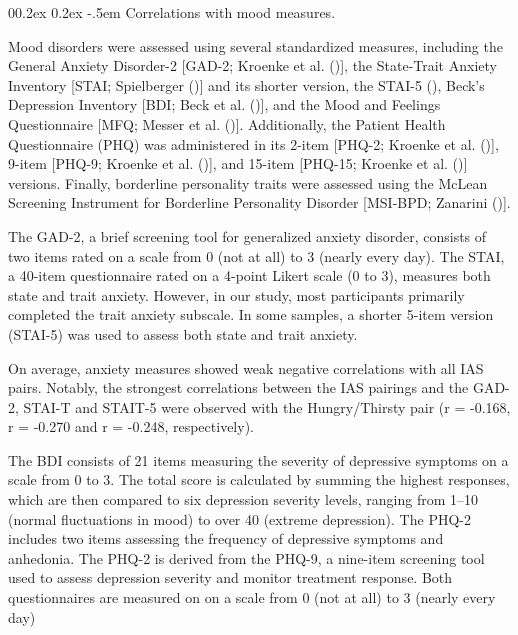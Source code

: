 \documentclass[
  man,
  floatsintext,
  longtable,
  nolmodern,
  notxfonts,
  notimes,
  colorlinks=true,linkcolor=blue,citecolor=blue,urlcolor=blue]{apa7}
\makeatletter
\renewcommand{\paragraph}{\@startsection{paragraph}{4}{\parindent}%
	{0\baselineskip \@plus 0.2ex \@minus 0.2ex}%
	{-.5em}%
	{\normalfont\normalsize\bfseries\typesectitle}}
\makeatother
\begin{document}
\paragraph{Correlations with mood
measures.}\label{correlations-with-mood-measures}

Mood disorders were assessed using several standardized measures,
including the General Anxiety Disorder-2 {[}GAD-2; Kroenke et al.
(){]}, the State-Trait Anxiety
Inventory {[}STAI; Spielberger
(){]} and its shorter version,
the STAI-5 (),
Beck's Depression Inventory {[}BDI; Beck et al.
(){]}, and the Mood and Feelings
Questionnaire {[}MFQ; Messer et al.
(){]}. Additionally, the
Patient Health Questionnaire (PHQ) was administered in its 2-item
{[}PHQ-2; Kroenke et al. (){]},
9-item {[}PHQ-9; Kroenke et al.
(){]}, and 15-item {[}PHQ-15; Kroenke
et al. (){]} versions. Finally,
borderline personality traits were assessed using the McLean Screening
Instrument for Borderline Personality Disorder {[}MSI-BPD; Zanarini
(){]}.

The GAD-2, a brief screening tool for generalized anxiety disorder,
consists of two items rated on a scale from 0 (not at all) to 3 (nearly
every day). The STAI, a 40-item questionnaire rated on a 4-point Likert
scale (0 to 3), measures both state and trait anxiety. However, in our
study, most participants primarily completed the trait anxiety subscale.
In some samples, a shorter 5-item version (STAI-5) was used to assess
both state and trait anxiety.

On average, anxiety measures showed weak negative correlations with all
IAS pairs. Notably, the strongest correlations between the IAS pairings
and the GAD-2, STAI-T and STAIT-5 were observed with the Hungry/Thirsty
pair (r = -0.168, r = -0.270 and r = -0.248, respectively).

The BDI consists of 21 items measuring the severity of depressive
symptoms on a scale from 0 to 3. The total score is calculated by
summing the highest responses, which are then compared to six depression
severity levels, ranging from 1--10 (normal fluctuations in mood) to
over 40 (extreme depression). The PHQ-2 includes two items assessing the
frequency of depressive symptoms and anhedonia. The PHQ-2 is derived
from the PHQ-9, a nine-item screening tool used to assess depression
severity and monitor treatment response. Both questionnaires are
measured on on a scale from 0 (not at all) to 3 (nearly every day)
\end{document}

